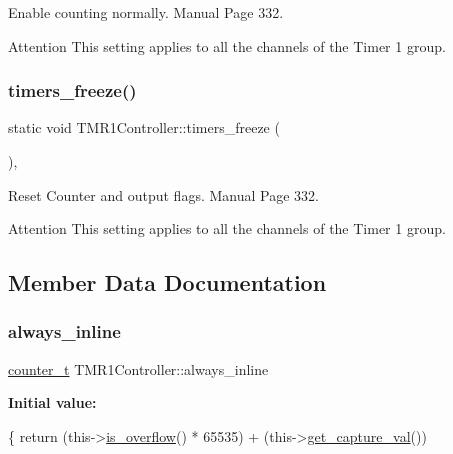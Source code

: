 Enable counting normally.  Manual Page 332. 

\begin{DoxyAttention}{Attention}
This setting applies to all the channels of the Timer 1 group. 
\end{DoxyAttention}
\mbox{\label{classTMR1Controller_aa00df5e2d591a36b1049275c9a293c51}} 
\subsubsection{\texorpdfstring{timers\+\_\+freeze()}{timers\_freeze()}}
{\footnotesize\ttfamily static void T\+M\+R1\+Controller\+::timers\+\_\+freeze (\begin{DoxyParamCaption}{ }\end{DoxyParamCaption})\hspace{0.3cm}{\ttfamily [inline]}, {\ttfamily [static]}}



Reset Counter and output flags.  Manual Page 332. 

\begin{DoxyAttention}{Attention}
This setting applies to all the channels of the Timer 1 group. 
\end{DoxyAttention}


\subsection{Member Data Documentation}
\mbox{\label{classTMR1Controller_adce8e8a496510485a88ccc5b88595672}} 
\subsubsection{\texorpdfstring{always\+\_\+inline}{always\_inline}}
{\footnotesize\ttfamily \hyperlink{types_8hpp_ac89ac912f524b3e3fa3720ea55fec966}{counter\+\_\+t} T\+M\+R1\+Controller\+::always\+\_\+inline}

{\bfseries Initial value\+:}
\begin{DoxyCode}
\{
        \textcolor{keywordflow}{return} (this->\hyperlink{classTMR1Controller_a06052b4a881156be3c7a4b6495d8ca11}{is\_overflow}() * 65535) + (this->\hyperlink{classTMR1Controller_a3d07eed72365e7a7b44fadefb23b9ba6}{get\_capture\_val}())
\end{DoxyCode}
\mbox{\label{classTMR1Controller_a532b729ca9a7c28e5f4d221f80487241}} 
